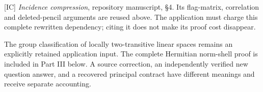 {[}IC{]} \emph{Incidence compression}, repository manuscript, §4. Its
flag-matrix, correlation and deleted-pencil arguments are reused above.
The application must charge this complete rewritten dependency; citing
it does not make its proof cost disappear.

The group classification of locally two-transitive linear spaces remains
an explicitly retained application input. The complete Hermitian norm-shell
proof is included in Part III below. A
source correction, an independently verified new question answer, and a
recovered principal contract have different meanings and receive
separate accounting.

